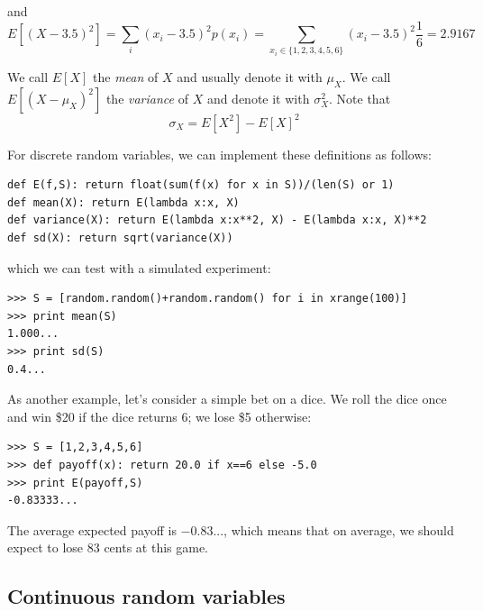 \documentclass[justified,sixbynine]{tufte-book}
\def\ft{\small\tt}
\theoremstyle{plain}%
\theoremstyle{definition}
\theoremstyle{remark}
\begin{document}
\begin{fullwidth}
and
\begin{equation}
E[(X-3.5)^2]=\sum_i(x_i-3.5)^2p(x_i)=\sum_{x_i\in
\{1,2,3,4,5,6\}}(x_i-3.5)^2\frac 16=2.9167
\end{equation}

We call $E[X]$ the {\it mean} of $X$ and usually denote it with $\mu _X$.
We call $E[(X-\mu _X)^2]$ the {\it variance} of $X$ and denote it with $\sigma _X^2$. Note that
\begin{equation}
\sigma _X=E[X^2]-E[X]^2
\end{equation}

For discrete random variables, we can implement these definitions as follows:

\begin{lstlisting}[caption={in file: {\ft nlib.py}}]
def E(f,S): return float(sum(f(x) for x in S))/(len(S) or 1)
def mean(X): return E(lambda x:x, X)
def variance(X): return E(lambda x:x**2, X) - E(lambda x:x, X)**2
def sd(X): return sqrt(variance(X))
\end{lstlisting}

which we can test with a simulated experiment:

\begin{lstlisting}[caption={in file: {\ft nlib.py}}]
>>> S = [random.random()+random.random() for i in xrange(100)]
>>> print mean(S)
1.000...
>>> print sd(S)
0.4...
\end{lstlisting}

As another example, let's consider a simple bet on a dice. We roll the dice once and win \$20 if the dice returns 6; we lose \$5 otherwise:

\begin{lstlisting}[caption={in file: {\ft nlib.py}}]
>>> S = [1,2,3,4,5,6]
>>> def payoff(x): return 20.0 if x==6 else -5.0
>>> print E(payoff,S)
-0.83333...
\end{lstlisting}

The average expected payoff is $-0.83...$, which means that on average, we should expect to lose 83 cents at this game.

\goodbreak\subsection{Continuous random variables}


\end{fullwidth}
\end{document}
